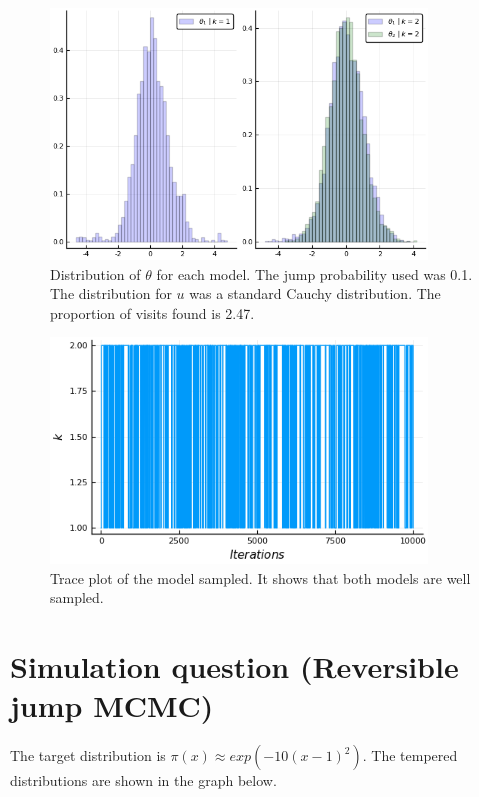\documentclass[12pt,letterpaper]{article}
\begin{document}
    \begin{figure}[H]
        \centering
        \includegraphics[width=10cm]{images/Reversible.png}
        \caption{Distribution of $\theta$ for each model. The jump
        probability used was 0.1. The distribution for $u$ was a
        standard Cauchy distribution.
        The proportion
        of visits found is 2.47.}
    \end{figure}

    \begin{figure}[H]
        \centering
        \includegraphics[width=10cm]{images/Jumps.png}
        \caption{Trace plot of the model sampled. It shows that both
        models are well sampled.}
        
    \end{figure}

\newpage
\section*{Simulation question (Reversible jump MCMC)}

The target distribution is $\pi(x) \approx exp(-10(x-1)^2)$.
The tempered distributions are shown in the graph below.
\end{document}
